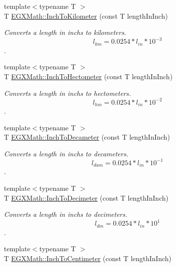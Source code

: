 \begin{DoxyCompactItemize}
{\footnotesize template$<$typename T $>$ }\\T \mbox{\hyperlink{group___e_g_x_math-_conversions-_length_conversions-_imperial-_inch-_s_i_ga8764c195dc365ed698383a0e59be1444}{E\+G\+X\+Math\+::\+Inch\+To\+Kilometer}} (const T length\+In\+Inch)
\begin{DoxyCompactList}\small\item\em Converts a length in inchs to kilometers. \[ l_{km}=0.0254 * l_{in} * 10^{-3} \]. \end{DoxyCompactList}\item 
{\footnotesize template$<$typename T $>$ }\\T \mbox{\hyperlink{group___e_g_x_math-_conversions-_length_conversions-_imperial-_inch-_s_i_ga2a991ddc6bcdb83749833f8075eb8cdb}{E\+G\+X\+Math\+::\+Inch\+To\+Hectometer}} (const T length\+In\+Inch)
\begin{DoxyCompactList}\small\item\em Converts a length in inchs to hectometers. \[ l_{hm}=0.0254 * l_{in} * 10^{-2} \]. \end{DoxyCompactList}\item 
{\footnotesize template$<$typename T $>$ }\\T \mbox{\hyperlink{group___e_g_x_math-_conversions-_length_conversions-_imperial-_inch-_s_i_ga84fad3dadf96d1f96530fb0e5fe8fca1}{E\+G\+X\+Math\+::\+Inch\+To\+Decameter}} (const T length\+In\+Inch)
\begin{DoxyCompactList}\small\item\em Converts a length in inchs to decameters. \[ l_{dam}=0.0254 * l_{in} * 10^{-1} \]. \end{DoxyCompactList}\item 
{\footnotesize template$<$typename T $>$ }\\T \mbox{\hyperlink{group___e_g_x_math-_conversions-_length_conversions-_imperial-_inch-_s_i_ga8a9bfe2e6e472e66f92146b5b867264b}{E\+G\+X\+Math\+::\+Inch\+To\+Decimeter}} (const T length\+In\+Inch)
\begin{DoxyCompactList}\small\item\em Converts a length in inchs to decimeters. \[ l_{dm}=0.0254 * l_{in} * 10^{1} \]. \end{DoxyCompactList}\item 
{\footnotesize template$<$typename T $>$ }\\T \mbox{\hyperlink{group___e_g_x_math-_conversions-_length_conversions-_imperial-_inch-_s_i_ga1a0fb189a0eb34f55a021d8372191f8e}{E\+G\+X\+Math\+::\+Inch\+To\+Centimeter}} (const T length\+In\+Inch)

\end{DoxyCompactItemize}

